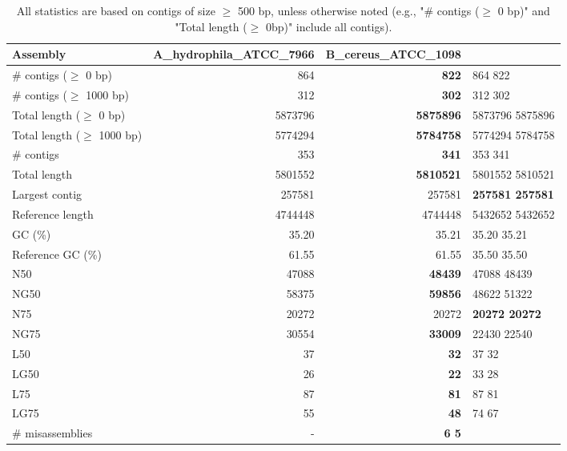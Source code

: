\documentclass[12pt,a4paper]{article}
\begin{document}
\begin{table}[ht]
\begin{center}
\caption{All statistics are based on contigs of size $\geq$ 500 bp, unless otherwise noted (e.g., "\# contigs ($\geq$ 0 bp)" and "Total length ($\geq$ 0bp)" include all contigs).}
\begin{tabular}{|l*{2}{|r}|}
\hline
Assembly & A\_hydrophila\_ATCC\_7966 & B\_cereus\_ATCC\_1098 \\ \hline
\# contigs ($\geq$ 0 bp) & 864 & {\bf 822} & 864                     822 \\ \hline
\# contigs ($\geq$ 1000 bp) & 312 & {\bf 302} & 312                     302 \\ \hline
Total length ($\geq$ 0 bp) & 5873796 & {\bf 5875896} & 5873796                 5875896 \\ \hline
Total length ($\geq$ 1000 bp) & 5774294 & {\bf 5784758} & 5774294                 5784758 \\ \hline
\# contigs & 353 & {\bf 341} & 353                     341 \\ \hline
Total length & 5801552 & {\bf 5810521} & 5801552                 5810521 \\ \hline
Largest contig & 257581 & 257581 & {\bf 257581                  257581} \\ \hline
Reference length & 4744448 & 4744448 & 5432652                 5432652 \\ \hline
GC (\%) & 35.20 & 35.21 & 35.20                   35.21 \\ \hline
Reference GC (\%) & 61.55 & 61.55 & 35.50                   35.50 \\ \hline
N50 & 47088 & {\bf 48439} & 47088                   48439 \\ \hline
NG50 & 58375 & {\bf 59856} & 48622                   51322 \\ \hline
N75 & 20272 & 20272 & {\bf 20272                   20272} \\ \hline
NG75 & 30554 & {\bf 33009} & 22430                   22540 \\ \hline
L50 & 37 & {\bf 32} & 37                      32 \\ \hline
LG50 & 26 & {\bf 22} & 33                      28 \\ \hline
L75 & 87 & {\bf 81} & 87                      81 \\ \hline
LG75 & 55 & {\bf 48} & 74                      67 \\ \hline
\# misassemblies & - & {\bf 6                       5} \\ \hline

\end{tabular}
\end{center}
\end{table}
\end{document}
